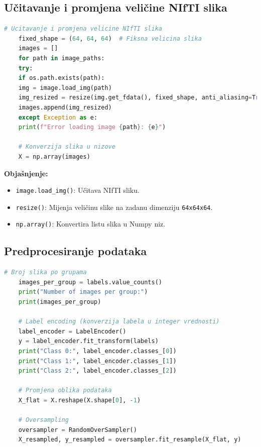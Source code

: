 \documentclass[zavrsnirad]{fer}
\begin{document}
\subsection{Učitavanje i promjena veličine NIfTI slika}

\begin{lstlisting}[language=Python, caption={Učitavanje i promjena veličine NIfTI slika}]
	# Ucitavanje i promjena velicine NIfTI slika
	fixed_shape = (64, 64, 64)  # Fiksna velicina slika
	images = []
	for path in image_paths:
	try:
	if os.path.exists(path):
	img = image.load_img(path)
	img_resized = resize(img.get_fdata(), fixed_shape, anti_aliasing=True)
	images.append(img_resized)
	except Exception as e:
	print(f"Error loading image {path}: {e}")
	
	# Konverzija slika u nizove
	X = np.array(images)
\end{lstlisting}

\noindent \textbf{Objašnjenje:}
\begin{itemize}
	\item \texttt{image.load\_img()}: Učitava NIfTI sliku.
	\item \texttt{resize()}: Mijenja veličinu slike na zadanu dimenziju \texttt{64x64x64}.
	\item \texttt{np.array()}: Konvertira listu slika u Numpy niz.
\end{itemize}

\subsection{Predprocesiranje podataka}

\begin{lstlisting}[language=Python, caption={Predprocesiranje podataka}]
	# Broj slika po grupama
	images_per_group = labels.value_counts()
	print("Number of images per group:")
	print(images_per_group)
	
	# Label encoding (konverzija labela u integer vrednosti)
	label_encoder = LabelEncoder()
	y = label_encoder.fit_transform(labels)
	print("Class 0:", label_encoder.classes_[0])
	print("Class 1:", label_encoder.classes_[1])
	print("Class 2:", label_encoder.classes_[2])
	
	# Promjena oblika podataka
	X_flat = X.reshape(X.shape[0], -1)
	
	# Oversampling
	oversampler = RandomOverSampler()
	X_resampled, y_resampled = oversampler.fit_resample(X_flat, y)
\end{lstlisting}
\end{document}
